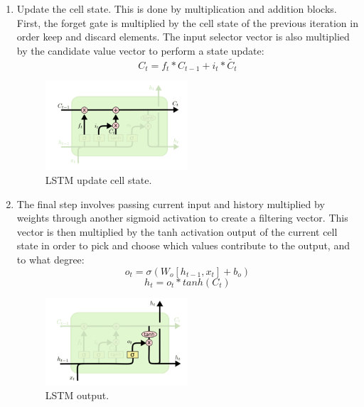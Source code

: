\begin{enumerate}
	\item Update the cell state. This is done by multiplication and addition blocks. First, the forget gate is multiplied by the cell state of the previous iteration in order keep and discard elements. The input selector vector is also multiplied by the candidate value vector to perform a state update:
	\begin{equation}
	C_{t} = f_{t}*C_{t-1} + i_{t}*\tilde{C_{t}}
	\end{equation}
	\begin{figure}[H]
		\includegraphics[width=0.5\textwidth]{images/LSTM_update.png}
		\caption{LSTM update cell state.}
	\end{figure}

	\item The final step involves passing current input and history multiplied by weights through another sigmoid activation to create a filtering vector. This vector is then multiplied by the tanh activation output of the current cell state in order to pick and choose which values contribute to the output, and to what degree:
	\begin{equation}
	o_{t} = \sigma(W_{o}[h_{t-1}, x_{t}] + b_{o})
	\end{equation}
	\begin{equation}
	h_{t} = o_{t}*tanh(C_{t})
	\end{equation}
	\begin{figure}[H]
		\includegraphics[width=0.5\textwidth]{images/LSTM_output.png}
		\caption{LSTM output.}
	\end{figure}

\end{enumerate}



